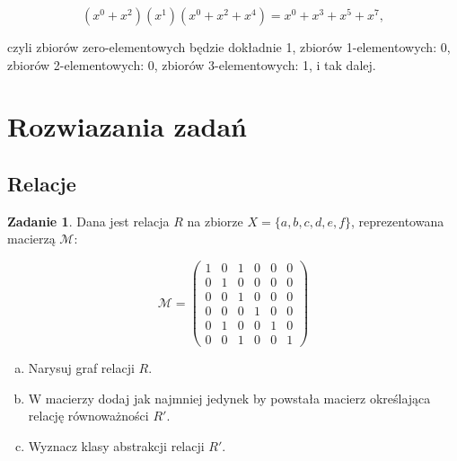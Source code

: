 \documentclass[11pt]{article}
\theoremstyle{definition}
\newtheorem{zadanie}{Zadanie}
\numberwithin{zadanie}{subsection}
\begin{document}
$$(x^0+x^2)(x^1)(x^0+x^2+x^4) = x^0+x^3+x^5+x^7,$$

czyli zbiorów zero-elementowych będzie dokładnie 1, zbiorów 1-elementowych: 0,
zbiorów 2-elementowych: 0, zbiorów 3-elementowych: 1, i tak dalej.

\section{Rozwiazania zadań}
\subsection{Relacje}
\begin{zadanie}
    Dana jest relacja $R$ na zbiorze $X = \{a,b,c,d,e,f\}$, reprezentowana macierzą $\mathcal M$:

    $$\mathcal M = \begin{pmatrix}
            1 & 0 & 1 & 0 & 0 & 0 \\
            0 & 1 & 0 & 0 & 0 & 0 \\
            0 & 0 & 1 & 0 & 0 & 0 \\
            0 & 0 & 0 & 1 & 0 & 0 \\
            0 & 1 & 0 & 0 & 1 & 0 \\
            0 & 0 & 1 & 0 & 0 & 1
        \end{pmatrix}$$

    \begin{enumerate}[a)]
        \item Narysuj graf relacji $R$.
        \item W macierzy dodaj jak najmniej jedynek by powstała macierz określająca relację równoważności $R'$.
        \item Wyznacz klasy abstrakcji relacji $R'$.
    \end{enumerate}
\end{zadanie}
\end{document}
